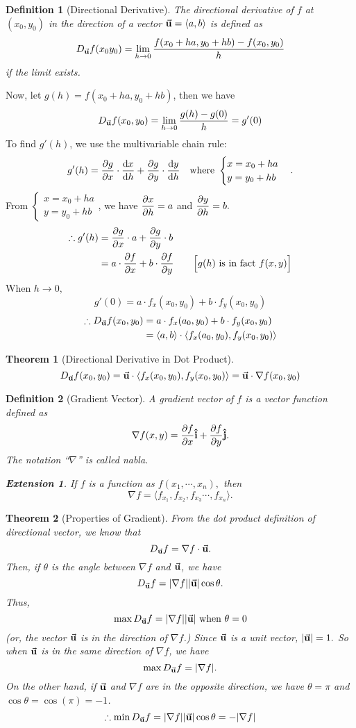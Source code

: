 \documentclass[12pt,a4paper]{article}
\newtheorem{thm}{Theorem}[subsection]
\newtheorem{df}{Definition}[subsection]
\newtheorem*{ext}{\indent Extension}
\def\vecu{\va{u}}
\def\veci{\vu{\boldsymbol{\textbf{i}}}}
\def\vecj{\vu{\boldsymbol{\textbf{j}}}}
\begin{document}
\begin{df}[Directional Derivative]
	The directional derivative of $f$ at $(x_0,y_0)$ in the direction of a vector $\vecu=\langle a,b\rangle$ is defined as \[D_{\vecu} f(x_0y_0)=\lim_{h\to0}\frac{f(x_0+ha,y_0+hb)-f(x_0,y_0)}{h}\] if the limit exists.
\end{df}
Now, let $g(h)=f(x_0+ha,y_0+hb)$, then we have \[D_{\vecu}f(x_0,y_0)=\lim_{h\to0}\frac{g(h)-g(0)}{h}=g'(0)\] To find $g'(h)$, we use the multivariable chain rule:\[g'(h)=\pdv{g}{x}\cdot\dv{x}{h}+\pdv{g}{y}\cdot\dv{y}{h}\quad\text{where }\begin{cases}x=x_0+ha\\y=y_0+hb\end{cases}.\] From $\begin{cases}x=x_0+ha\\y=y_0+hb\end{cases}$, we have $\displaystyle\pdv{x}{h}=a$ and $\displaystyle\pdv{y}{h}=b.$ \[\begin{aligned}\therefore g'(h)&=\pdv{g}{x}\cdot a+\pdv{g}{y}\cdot b\\&=a\cdot\pdv{f}{x}+b\cdot\pdv{f}{y}\qquad\Big[g(h)\text{ is in fact }f(x,y)\Big]\end{aligned}\] When $h\to0,$ \[g'(0)=a\cdot f_x(x_0,y_0)+b\cdot f_y(x_0,y_0)\]\[\begin{aligned}\therefore D_{\vecu}f(x_0,y_0)&=a\cdot f_x(a_0,y_0)+b\cdot f_y(x_0,y_0)\\&=\langle a,b\rangle\cdot\langle f_x(a_0,y_0),f_y(x_0,y_0)\rangle\end{aligned}\]
\begin{thm}[Directional Derivative in Dot Product]
	\[D_{\vecu}f(x_0,y_0)=\vecu\cdot\langle f_x(x_0,y_0), f_y(x_0,y_0)\rangle=\vecu\cdot\nabla f(x_0,y_0)\]
\end{thm}
\begin{df}[Gradient Vector]
	A gradient vector of $f$ is a vector function defined as \[\nabla f(x,y)=\pdv{f}{x}\veci+\pdv{f}{y}\vecj.\] The notation ``$\nabla$'' is called nabla.
	\begin{ext}
		If $f$ is a function as $f(x_1,\cdots,x_n),$ then \[\nabla f=\langle f_{x_1},f_{x_2}, f_{x_3}\cdots,f_{x_n}\rangle.\]
	\end{ext}
\end{df}
\begin{thm}[Properties of Gradient]
	From the dot product definition of directional vector, we know that \[D_{\vecu}f=\nabla f\cdot\vecu.\] Then, if $\theta$ is the angle between $\nabla f$ and $\vecu$, we have \[D_{\vecu}f=\qty|\nabla f|\qty|\vecu|\cos\theta.\] Thus, \[\max D_{\vecu}f=\qty|\nabla f|\qty|\vecu|\text{ when }\theta=0\] (or, the vector $\vecu$ is in the direction of $\nabla f$.) Since $\vecu$ is a unit vector, $\qty|\vecu|=1.$ So when $\vecu$ is in the same direction of $\nabla f$, we have \[\max D_{\vecu}f=\qty|\nabla f|.\] On the other hand, if $\vecu$ and $\nabla f$ are in the opposite direction, we have $\theta=\pi$ and $\cos\theta=\cos(\pi)=-1$.\[\therefore\min D_{\vecu}f=\qty|\nabla f|\qty|\vecu|\cos\theta=-\qty|\nabla f|\]
\end{thm}
\end{document}
